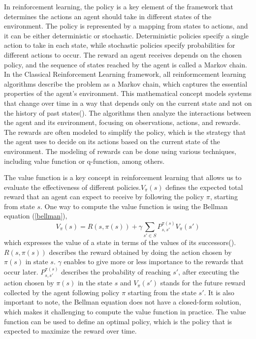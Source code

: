 In reinforcement learning, the policy is a key element of the framework that determines the actions an agent should take in different states of the environment. The policy is represented by a mapping from states to actions, and it can be either deterministic or stochastic. Deterministic policies specify a single action to take in each state, while stochastic policies specify probabilities for different actions to occur. The reward an agent receives depends on the chosen policy, and the sequence of states reached by the agent is called a Markov chain. In the Classical Reinforcement Learning framework, all reinformcement learning algorithms describe the problem as a Markov chain, which captures the essential properties of the agent's environment. This mathematical concept models systems that change over time in a way that depends only on the current state and not on the history of past states(\cite{sutton_reinforcement_1998,sutton_reinforcement_2018}). The algorithms then analyze the interactions between the agent and its environment, focusing on observations, actions, and rewards. The rewards are often modeled to simplify the policy, which is the strategy that the agent uses to decide on its actions based on the current state of the environment. The modeling of rewards can be done using various techniques, including value function or q-function, among others.

The value function is a key concept in reinforcement learning that allows us to evaluate the effectiveness of different policies.$V_{\pi}(s)$ defines the expected total reward that an agent can expect to receive by following the policy $\pi$, starting from state $s$. One way to compute the value function is using the Bellman equation (\ref{bellman}),
\begin{equation}\label{bellman}
V_{\pi}(s) = R(s, \pi(s)) + \gamma \sum_{s' \in S} P_{s, s'}^{\pi(s)} V_{\pi}(s')
\end{equation}
which expresses the value of a state in terms of the values of its successors(\cite{barron_bellman_1989}). $R(s, \pi(s))$ describes the reward obtained by doing the action chosen by $\pi(s)$ in state $s$. $\gamma$ enables to give more or less importance to the rewards that occur later. $ P_{s, s'}^{\pi(s)}$ describes the probability of reaching $s'$, after executing the action chosen by $\pi(s)$ in the state $s$ and $V_{\pi}(s')$ stands for the future reward collected by the agent following policy $\pi$ starting from the state $s'$. It is also important to note, the Bellman equation does not have a closed-form solution, which makes it challenging to compute the value function in practice.
The value function can be used to define an optimal policy, which is the policy that is expected to maximize the reward over time.

